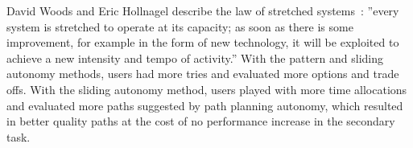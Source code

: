 \documentclass[lettersize, apacite, twoside, HRI]{apa_HRI}
\begin{document}
David Woods and Eric Hollnagel describe the law of stretched systems~\cite{Woods2006Joint}: ''every system is stretched to operate at its capacity; as soon as there is some improvement, for example in the form of new technology, it will be exploited to achieve a new intensity and tempo of activity.'' With the pattern and sliding autonomy methods, users had more tries and evaluated more options and trade offs. With the sliding autonomy method, users played with more time allocations and evaluated more paths suggested by path planning autonomy, which resulted in better quality paths at the cost of no performance increase in the secondary task.

%
%
\end{document}
